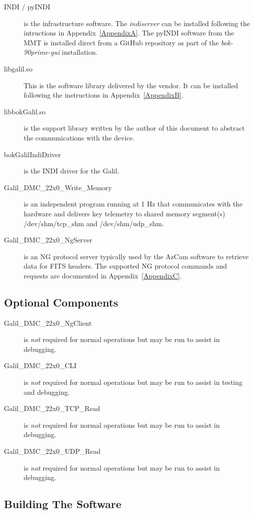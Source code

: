 \documentclass[12pt,twoside]{article}
\begin{document}
\begin{description}
 \item[INDI / pyINDI] is the infrastructure software. The \emph{indiserver} can be installed following the intructions in
       Appendix~\ref{AppendixA}. The pyINDI software from the MMT is installed direct from a GitHub repository as part of
       the \emph{bok-90prime-gui} installation.
 \item[libgalil.so] This is the software library delivered by the vendor. It can be installed following the instructions in
       Appendix~\ref{AppendixB}.
 \item[libbokGalil.so] is the support library written by the author of this document to abstract the communications
      with the device.
 \item[bokGalilIndiDriver] is the INDI driver for the Galil.
 \item[Galil\_DMC\_22x0\_Write\_Memory] is an independent program running at 1 Hz that communicates with the 
       hardware and delivers key telemetry to shared memory segment(s) /dev/shm/tcp\_shm and /dev/shm/udp\_shm.
 \item[Galil\_DMC\_22x0\_NgServer] is an NG protocol server typically used by the AzCam software to retrieve data for FITS
      headers. The supported NG protocol commands and requests are documented in Appendix~\ref{AppendixC}.
\end{description}

\subsection{Optional Components}
\label{optionalcomponents}

\begin{description}
 \item[Galil\_DMC\_22x0\_NgClient] is \emph{not} required for normal operations but may be run to assist in debugging.
 \item[Galil\_DMC\_22x0\_CLI] is \emph{not} required for normal operations but may be run to assist in testing and debugging.
 \item[Galil\_DMC\_22x0\_TCP\_Read] is \emph{not} required for normal operations but may be run to assist in debugging.
 \item[Galil\_DMC\_22x0\_UDP\_Read] is \emph{not} required for normal operations but may be run to assist in debugging.
\end{description}

\subsection{Building The Software}
\label{buildingthesoftware}
\end{document}
